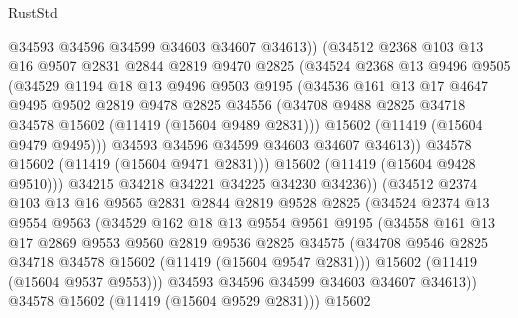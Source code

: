 \begin{lexlean}{RustStd}
\begin{coremodule}
                  @34593
                  @34596
                  @34599
                  @34603
                  @34607
                  @34613))
              (@34512
                @2368
                @103
                @13
                @16
                @9507
                @2831
                @2844
                @2819
                @9470
                @2825
                (@34524
                  @2368
                  @13
                  @9496
                  @9505
                  (@34529
                    @1194
                    @18
                    @13
                    @9496
                    @9503
                    @9195
                    (@34536
                      @161
                      @13
                      @17
                      @4647
                      @9495
                      @9502
                      @2819
                      @9478
                      @2825
                      @34556
                      (@34708 @9488 @2825 @34718 @34578 @15602 (@11419 (@15604 @9489 @2831)))
                      @15602
                      (@11419 (@15604 @9479 @9495)))
                    @34593
                    @34596
                    @34599
                    @34603
                    @34607
                    @34613))
                @34578
                @15602
                (@11419 (@15604 @9471 @2831)))
              @15602
              (@11419 (@15604 @9428 @9510)))
            @34215
            @34218
            @34221
            @34225
            @34230
            @34236))
        (@34512
          @2374
          @103
          @13
          @16
          @9565
          @2831
          @2844
          @2819
          @9528
          @2825
          (@34524
            @2374
            @13
            @9554
            @9563
            (@34529
              @162
              @18
              @13
              @9554
              @9561
              @9195
              (@34558
                @161
                @13
                @17
                @2869
                @9553
                @9560
                @2819
                @9536
                @2825
                @34575
                (@34708 @9546 @2825 @34718 @34578 @15602 (@11419 (@15604 @9547 @2831)))
                @15602
                (@11419 (@15604 @9537 @9553)))
              @34593
              @34596
              @34599
              @34603
              @34607
              @34613))
          @34578
          @15602
          (@11419 (@15604 @9529 @2831)))
        @15602

\end{coremodule}
\end{lexlean}
